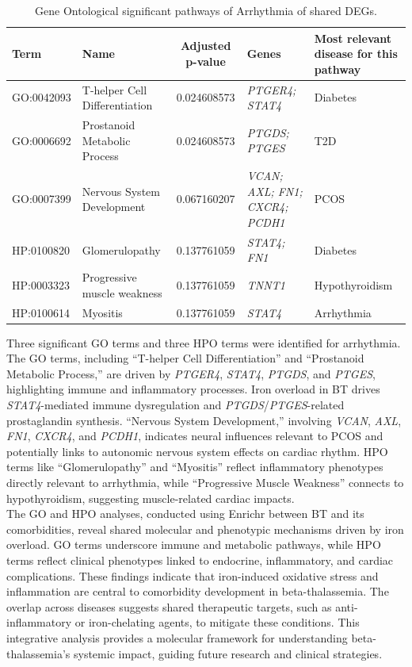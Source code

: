 \begin{table}[H]
\centering
\caption{Gene Ontological significant pathways of Arrhythmia of shared DEGs.}

\renewcommand{\arraystretch}{1.0}
\small
\begin{tabularx}{\textwidth}{|l|X|c|X|X|}
\hline
\textbf{Term} & \textbf{Name} & \textbf{Adjusted p-value} & \textbf{Genes} & \textbf{Most relevant disease for this pathway} \\
\hline
GO:0042093 & T-helper Cell Differentiation & 0.024608573 & \textit{PTGER4; STAT4} & Diabetes \\
\hline
GO:0006692 & Prostanoid Metabolic Process & 0.024608573 & \textit{PTGDS; PTGES} & T2D \\
\hline
GO:0007399 & Nervous System Development & 0.067160207 & \textit{VCAN; AXL; FN1; CXCR4; PCDH1} & PCOS \\
\hline
HP:0100820 & Glomerulopathy & 0.137761059 & \textit{STAT4; FN1} & Diabetes \\
\hline
HP:0003323 & Progressive muscle weakness & 0.137761059 & \textit{TNNT1} & Hypothyroidism \\
\hline
HP:0100614 & Myositis & 0.137761059 & \textit{STAT4} & Arrhythmia \\
\hline
\end{tabularx}
\end{table}

Three significant GO terms and three HPO terms were identified for arrhythmia. The GO terms, including ``T-helper Cell Differentiation'' and ``Prostanoid Metabolic Process,'' are driven by \textit{PTGER4}, \textit{STAT4}, \textit{PTGDS}, and \textit{PTGES}, highlighting immune and inflammatory processes. Iron overload in BT drives \textit{STAT4}-mediated immune dysregulation and \textit{PTGDS}/\textit{PTGES}-related prostaglandin synthesis. ``Nervous System Development,'' involving \textit{VCAN}, \textit{AXL}, \textit{FN1}, \textit{CXCR4}, and \textit{PCDH1}, indicates neural influences relevant to PCOS and potentially links to autonomic nervous system effects on cardiac rhythm. HPO terms like ``Glomerulopathy'' and ``Myositis'' reflect inflammatory phenotypes directly relevant to arrhythmia, while ``Progressive Muscle Weakness'' connects to hypothyroidism, suggesting muscle-related cardiac impacts.\\

The GO and HPO analyses, conducted using Enrichr between BT and its comorbidities, reveal shared molecular and phenotypic mechanisms driven by iron overload. GO terms underscore immune and metabolic pathways, while HPO terms reflect clinical phenotypes linked to endocrine, inflammatory, and cardiac complications. These findings indicate that iron-induced oxidative stress and inflammation are central to comorbidity development in beta-thalassemia. The overlap across diseases suggests shared therapeutic targets, such as anti-inflammatory or iron-chelating agents, to mitigate these conditions. This integrative analysis provides a molecular framework for understanding beta-thalassemia's systemic impact, guiding future research and clinical strategies.


